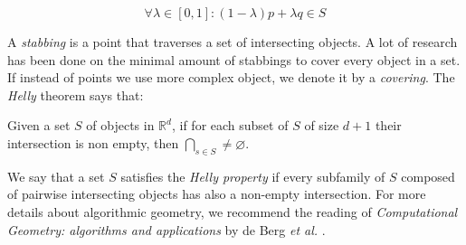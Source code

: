 $$\forall \lambda \in [0,1]: (1-\lambda)p + \lambda q \in S$$

A \emph{stabbing} is a point that traverses a set of intersecting objects. A lot of research has been done \cite{schlipf2013stabbing} on the minimal amount of stabbings to cover every object in a set. If instead of points we use more complex object, we denote it by a \emph{covering}. The \emph{Helly} theorem says that:

\begin{_theo}
  Given a set $S$ of objects in $\mathbb{R}^d$, if for each subset of $S$ of
  size $d+1$ their intersection is non empty, then $\bigcap_{s \in S} \neq
  \varnothing$.
\end{_theo}

We say that a set $S$ satisfies the \emph{Helly property} if every subfamily of $S$ composed of pairwise intersecting objects has also a non-empty intersection. For more details about algorithmic geometry, we recommend the reading of \textit{Computational Geometry: algorithms and applications} by de Berg \textit{et al.} \cite{bergComputationalGeometryAlgorithms2008}.
